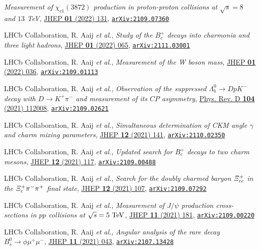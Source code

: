 \documentclass[a4paper, 11pt]{article}
\newenvironment{cvcontent}{
  \leftskip=0.5cm\rightskip=0cm
  \noindent\ignorespaces}{\par}
\newcommand{\arxiv}[1]{\href{https://arxiv.org/abs/#1}{\texttt{arXiv:#1}}}
\begin{document}
\begin{cvcontent}
\begin{enumerate}[label={[\arabic*]}, leftmargin=1.5cm]
    \emph{Measurement of $\chi_{c1}(3872)$ production in proton-proton collisions at $\sqrt{s}=8$ and $13$ TeV},
    \href{https://doi.org/10.1007/JHEP01(2022)131}{JHEP \textbf{01} (2022) 131},
    \arxiv{2109.07360}
    \item LHCb Collaboration, R. Aaij \emph{et al.}, 
    \emph{Study of the $B_c^+$ decays into charmonia and three light hadrons},
    \href{https://doi.org/10.1007/JHEP01(2022)065}{JHEP \textbf{01} (2022) 065},
    \arxiv{2111.03001}
    \item LHCb Collaboration, R. Aaij \emph{et al.}, 
    \emph{Measurement of the W boson mass}, 
    \href{https://doi.org/10.1007/JHEP01(2022)036}{JHEP \textbf{01} (2022) 036},
    \arxiv{2109.01113}
    \item LHCb Collaboration, R. Aaij \emph{et al.}, 
    \emph{Observation of the suppressed $\Lambda_b^0\to D p K^-$ decay with $D\to K^+ \pi^-$ and measurement of its $C\!P$ asymmetry}, 
    \href{https://link.aps.org/doi/10.1103/PhysRevD.104.112008}{Phys. Rev. D \textbf{104} (2021) 112008},
    \arxiv{2109.02621}
    \item LHCb Collaboration, R. Aaij \emph{et al.}, 
    \emph{Simultaneous determination of CKM angle $\gamma$ and charm mixing parameters},
    \href{https://doi.org/10.1007/JHEP12(2021)141}{JHEP \textbf{12} (2021) 141},
    \arxiv{2110.02350}
    \sloppy
    \item LHCb Collaboration, R. Aaij \emph{et al.}, 
    \emph{Updated search for $B_c^+$ decays to two charm mesons},
    \href{https://doi.org/10.1007/JHEP12(2021)117}{JHEP \textbf{12} (2021) 117},
    \arxiv{2109.00488}
    \item LHCb Collaboration, R. Aaij \emph{et al.}, 
    \emph{Search for the doubly charmed baryon $\it{\Xi}_{cc}^{+}$ in the $\it{\Xi}_{c}^{+} \pi^{-} \pi^{+}$ final state},
    \href{https://doi.org/10.1007/JHEP12(2021)107}{JHEP \textbf{12} (2021) 107},
    \arxiv{2109.07292}
    \item LHCb Collaboration, R. Aaij \emph{et al.}, 
    \emph{Measurement of $J/\psi$ production cross-sections in $pp$ collisions at $\sqrt{s}=5~\rm{TeV}$},
    \href{http://dx.doi.org/10.1007/JHEP11(2021)181}{JHEP \textbf{11} (2021) 181},
    \arxiv{2109.00220}
    \sloppy
    \item LHCb Collaboration, R. Aaij \emph{et al.}, 
    \emph{Angular analysis of the rare decay $B_s^0 \to \phi \mu^+ \mu^-$},
    \href{http://dx.doi.org/10.1007/JHEP11(2021)043}{JHEP \textbf{11} (2021) 043},
    \arxiv{2107.13428}
  \end{enumerate}
\end{cvcontent}
\end{document}

